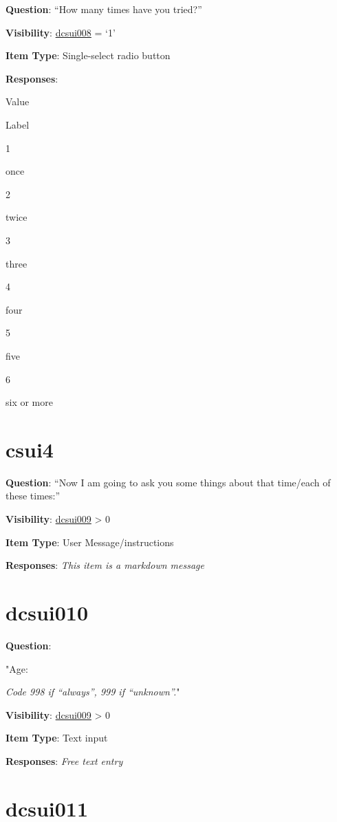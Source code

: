 \documentclass[]{book}
\begin{document}
\textbf{Question}: ``How many times have you tried?''

\textbf{Visibility}: \protect\hyperlink{dcsui008}{dcsui008} = `1'

\textbf{Item Type}: Single-select radio button

\textbf{Responses}:

Value

Label

1

once

2

twice

3

three

4

four

5

five

6

six or more

\hypertarget{csui4}{%
\section{csui4}\label{csui4}}

\textbf{Question}: ``Now I am going to ask you some things about that time/each of these times:''

\textbf{Visibility}: \protect\hyperlink{dcsui009}{dcsui009} \textgreater{} 0

\textbf{Item Type}: User Message/instructions

\textbf{Responses}: \emph{This item is a markdown message}

\hypertarget{dcsui010}{%
\section{dcsui010}\label{dcsui010}}

\textbf{Question}:

"Age:

\emph{Code 998 if ``always'', 999 if ``unknown''.}"

\textbf{Visibility}: \protect\hyperlink{dcsui009}{dcsui009} \textgreater{} 0

\textbf{Item Type}: Text input

\textbf{Responses}: \emph{Free text entry}

\hypertarget{dcsui011}{%
\section{dcsui011}\label{dcsui011}}
\end{document}
